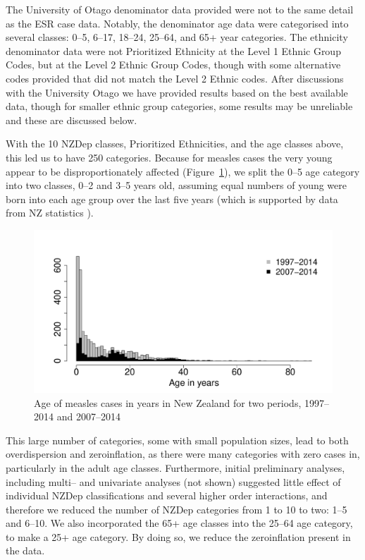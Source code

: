 \documentclass{article}
\begin{document}
The University of Otago denominator data provided were not to the same detail as the ESR case data. Notably, the denominator age data were categorised into several classes: 0--5, 6--17, 18--24, 25--64, and 65+ year categories. The ethnicity denominator data were not Prioritized Ethnicity at the Level 1 Ethnic Group Codes, but at the Level 2 Ethnic Group Codes, though with some alternative codes provided that did not match the Level 2 Ethnic codes. After discussions with the University Otago we have provided results based on the best available data, though for smaller ethnic group categories, some results may be unreliable and these are discussed below.

With the 10 NZDep classes, Prioritized Ethnicities, and the age classes above, this led us to have 250 categories. Because for measles cases the very young appear to be disproportionately affected (Figure~\ref{fig:ageinyears}), we split the 0--5 age category into two classes, 0--2 and 3--5 years old, assuming equal numbers of young were born into each age group over the last five years (which is supported by data from NZ statistics \citep{stats14}).


\begin{figure}[h!]
\begin{center}
\includegraphics{interimreport2-002}
\end{center}
\caption{Age of measles cases in years in New Zealand for two periods, 1997--2014 and 2007--2014}
\label{fig:ageinyears}
\end{figure}





This large number of categories, some with small population sizes, lead to both overdispersion and zeroinflation, as there were many categories with zero cases in, particularly in the adult age classes. Furthermore, initial preliminary analyses, including multi-- and univariate analyses (not shown) suggested little effect of individual NZDep classifications and several higher order interactions, and therefore we reduced the number of NZDep categories from 1 to 10 to two: 1--5 and 6--10. We also incorporated the 65+ age classes into the 25--64 age category, to make a 25+ age category. By doing so, we reduce the zeroinflation present in the data. 
\end{document}
